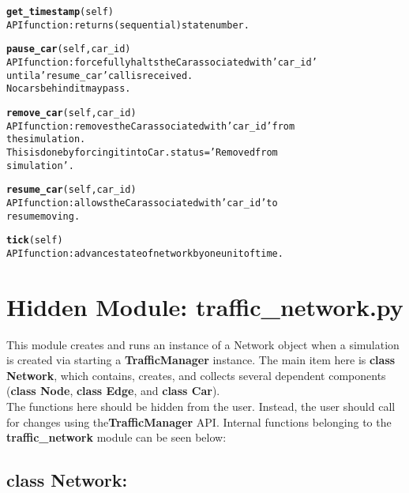 \begin{alltt}
\textbf{get_timestamp}(self)
API function:  returns (sequential) state number.

\textbf{pause_car}(self, car_id)
API function:  forcefully halts the Car associated with 'car_id' 
until a 'resume_car' call is received.
No cars behind it may pass.

\textbf{remove_car}(self, car_id)
API function:  removes the Car associated with 'car_id' from
the simulation.
This is done by forcing it into Car.status = 'Removed from 
simulation'.

\textbf{resume_car}(self, car_id)
API function:  allows the Car associated with 'car_id' to 
resume moving.

\textbf{tick}(self)
API function:  advance state of network by one unit of time.


\end{alltt}

\section{Hidden Module: traffic\_network.py}

This module creates and runs an instance of a Network object when a simulation is created via starting a \textbf{TrafficManager} instance.  The main item here is \textbf{class Network}, which  contains, creates, and collects several dependent components (\textbf{class Node}, \textbf{class Edge}, and \textbf{class Car}).  \\

\noindent The functions here should be hidden from the user.  Instead, the user should call for changes using the\textbf{TrafficManager} API.  Internal functions belonging to the \textbf{traffic\_network} module can be seen below:

\subsection{class Network:}

